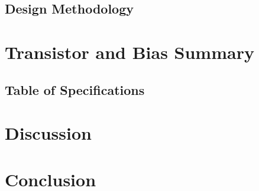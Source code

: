\documentclass[12pt, fleqn]{article}
\begin{document}
\subsection{Design Methodology}
\newpage
\section{Transistor and Bias Summary}
\subsection{Table of Specifications}
\newpage
\section{Discussion}
\newpage
\section{Conclusion}
\end{document}
